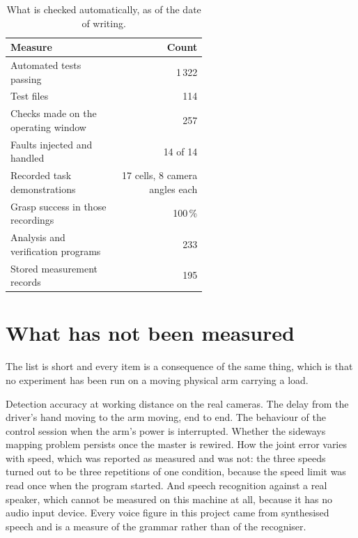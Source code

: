 \begin{table}[htbp]
  \centering
  \small
  \caption[Verification totals]{What is checked automatically, as of the date
  of writing.}
  \label{tab:verification}
  \begin{tabular}{@{}p{0.56\linewidth}r@{}}
    \toprule
    \textbf{Measure} & \textbf{Count} \\
    \midrule
    Automated tests passing & 1\,322 \\
    Test files & 114 \\
    Checks made on the operating window & 257 \\
    Faults injected and handled & 14 of 14 \\
    Recorded task demonstrations & 17 cells, 8 camera angles each \\
    Grasp success in those recordings & 100\,\% \\
    Analysis and verification programs & 233 \\
    Stored measurement records & 195 \\
    \bottomrule
  \end{tabular}
\end{table}

\section{What has not been measured}

The list is short and every item is a consequence of the same thing, which is
that no experiment has been run on a moving physical arm carrying a load.

Detection accuracy at working distance on the real cameras. The delay from the
driver's hand moving to the arm moving, end to end. The behaviour of the
control session when the arm's power is interrupted. Whether the sideways
mapping problem persists once the master is rewired. How the joint error
varies with speed, which was reported as measured and was not: the three
speeds turned out to be three repetitions of one condition, because the speed
limit was read once when the program started. And speech recognition against a
real speaker, which cannot be measured on this machine at all, because it has
no audio input device. Every voice figure in this project came from
synthesised speech and is a measure of the grammar rather than of the
recogniser.
